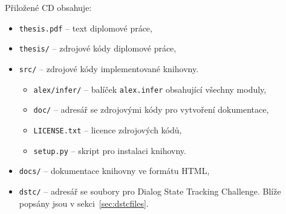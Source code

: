 \documentclass[12pt,a4paper]{report}
\let\openright=\clearpage
\begin{document}
Přiložené CD obsahuje:

\newcommand{\priloha}[2]{\item \texttt{#1} -- #2}
\begin{itemize}
\priloha{thesis.pdf}{text diplomové práce,}
\priloha{thesis/}{zdrojové kódy diplomové práce,}
\priloha{src/}{zdrojové kódy implementované knihovny.
	\begin{itemize}
	\priloha{alex/infer/}{balíček \texttt{alex.infer} obsahující všechny moduly,}
	\priloha{doc/}{adresář se zdrojovými kódy pro vytvoření dokumentace,}
	\priloha{LICENSE.txt}{licence zdrojových kódů,}
	\priloha{setup.py}{skript pro instalaci knihovny.}
	\end{itemize}
}
\priloha{docs/}{dokumentace knihovny ve formátu HTML,}
\priloha{dstc/}{adresář se soubory pro Dialog State Tracking Challenge. Blíže popsány jsou v sekci~\ref{sec:dstcfiles}.
}
\end{itemize}

\openright
\end{document}
